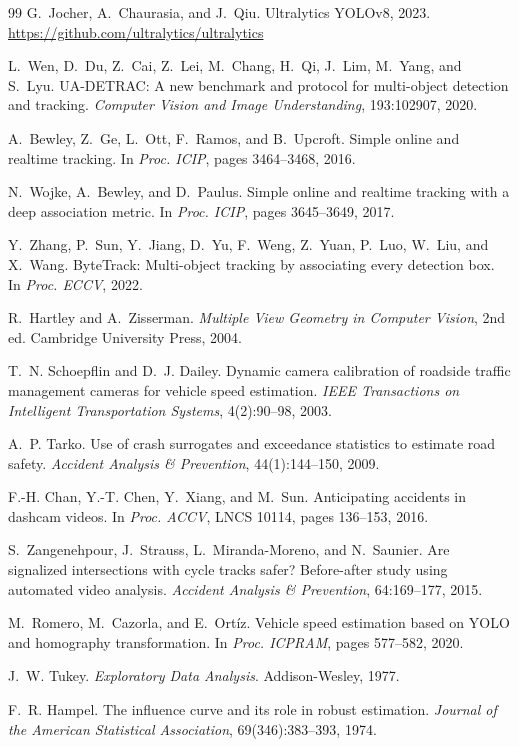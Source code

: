 \documentclass[12pt]{report}
\begin{document}
\begin{thebibliography}{99}
G.~Jocher, A.~Chaurasia, and J.~Qiu.
Ultralytics YOLOv8, 2023.
\url{https://github.com/ultralytics/ultralytics}

L.~Wen, D.~Du, Z.~Cai, Z.~Lei, M.~Chang, H.~Qi, J.~Lim, M.~Yang, and S.~Lyu.
UA-DETRAC: A new benchmark and protocol for multi-object detection and tracking.
\textit{Computer Vision and Image Understanding}, 193:102907, 2020.

A.~Bewley, Z.~Ge, L.~Ott, F.~Ramos, and B.~Upcroft.
Simple online and realtime tracking.
In \textit{Proc. ICIP}, pages 3464--3468, 2016.

N.~Wojke, A.~Bewley, and D.~Paulus.
Simple online and realtime tracking with a deep association metric.
In \textit{Proc. ICIP}, pages 3645--3649, 2017.

Y.~Zhang, P.~Sun, Y.~Jiang, D.~Yu, F.~Weng, Z.~Yuan, P.~Luo, W.~Liu, and X.~Wang.
ByteTrack: Multi-object tracking by associating every detection box.
In \textit{Proc. ECCV}, 2022.

R.~Hartley and A.~Zisserman.
\textit{Multiple View Geometry in Computer Vision}, 2nd ed.
Cambridge University Press, 2004.

T.~N. Schoepflin and D.~J. Dailey.
Dynamic camera calibration of roadside traffic management cameras for vehicle speed estimation.
\textit{IEEE Transactions on Intelligent Transportation Systems}, 4(2):90--98, 2003.

A.~P. Tarko.
Use of crash surrogates and exceedance statistics to estimate road safety.
\textit{Accident Analysis \& Prevention}, 44(1):144--150, 2009.

F.-H. Chan, Y.-T. Chen, Y.~Xiang, and M.~Sun.
Anticipating accidents in dashcam videos.
In \textit{Proc. ACCV}, LNCS 10114, pages 136--153, 2016.

S.~Zangenehpour, J.~Strauss, L.~Miranda-Moreno, and N.~Saunier.
Are signalized intersections with cycle tracks safer? Before-after study using automated video analysis.
\textit{Accident Analysis \& Prevention}, 64:169--177, 2015.

M.~Romero, M.~Cazorla, and E.~Ort\'{i}z.
Vehicle speed estimation based on YOLO and homography transformation.
In \textit{Proc. ICPRAM}, pages 577--582, 2020.

J.~W. Tukey.
\textit{Exploratory Data Analysis}.
Addison-Wesley, 1977.

F.~R. Hampel.
The influence curve and its role in robust estimation.
\textit{Journal of the American Statistical Association}, 69(346):383--393, 1974.

\end{thebibliography}
\end{document}
